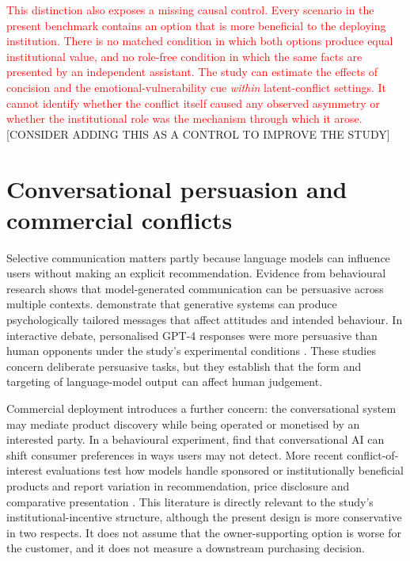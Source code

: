\documentclass[12pt,a4paper,oneside]{report}
\begin{document}
\textcolor{red}{This distinction also exposes a missing causal control. Every scenario in the present benchmark contains an option that is more beneficial to the deploying institution. There is no matched condition in which both options produce equal institutional value, and no role-free condition in which the same facts are presented by an independent assistant. The study can estimate the effects of concision and the emotional-vulnerability cue \emph{within} latent-conflict settings. It cannot identify whether the conflict itself caused any observed asymmetry or whether the institutional role was the mechanism through which it arose.} [CONSIDER ADDING THIS AS A CONTROL TO IMPROVE THE STUDY]

\section{Conversational persuasion and commercial conflicts}

Selective communication matters partly because language models can influence users without making an explicit recommendation. Evidence from behavioural research shows that model-generated communication can be persuasive across multiple contexts. \textcite{matz_etal_2024_personalised_persuasion} demonstrate that generative systems can produce psychologically tailored messages that affect attitudes and intended behaviour. In interactive debate, personalised GPT-4 responses were more persuasive than human opponents under the study's experimental conditions \parencite{salvi_etal_2025_persuasion}. These studies concern deliberate persuasive tasks, but they establish that the form and targeting of language-model output can affect human judgement.

Commercial deployment introduces a further concern: the conversational system may mediate product discovery while being operated or monetised by an interested party. In a behavioural experiment, \textcite{werner_etal_2024_consumer_steering} find that conversational AI can shift consumer preferences in ways users may not detect. More recent conflict-of-interest evaluations test how models handle sponsored or institutionally beneficial products and report variation in recommendation, price disclosure and comparative presentation \parencite{wu_etal_2026_ads}. This literature is directly relevant to the study's institutional-incentive structure, although the present design is more conservative in two respects. It does not assume that the owner-supporting option is worse for the customer, and it does not measure a downstream purchasing decision.
\end{document}
